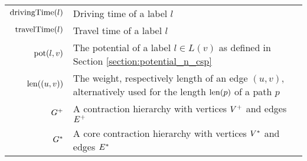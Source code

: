 \begin{tabular}{rp{}}
	$\operatorname{drivingTime}(l)$          & Driving time of a label $l$                                                                                                               \\
	$\operatorname{travelTime}(l)$          & Travel time of a label $l$                                                                                                                \\
	$\operatorname{pot}(l,v)$ & The potential of a label $l \in L(v)$ as defined in Section \ref{section:potential_n_csp}                                                 \\
	$\operatorname{len}((u,v))$             & The weight, respectively length of an edge $(u,v)$, alternatively used for the length $\operatorname{len}(p)$ of a path $p$                             \\
	$G^+$                     & A contraction hierarchy with vertices $V^+$ and edges $E^+$                                                                             \\
	$G^*$                 & A core contraction hierarchy with vertices $V^*$ and edges $E^*$                                                                \\
\end{tabular}



